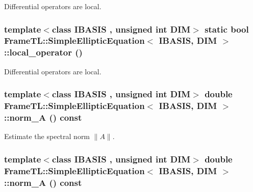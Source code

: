 Differential operators are local. \hypertarget{classFrameTL_1_1SimpleEllipticEquation_cd41f35521f8ac7af05fd0294cbf76ef}{
\subsubsection[{local\_\-operator}]{\setlength{\rightskip}{0pt plus 5cm}template$<$class IBASIS , unsigned int DIM$>$ static bool {\bf FrameTL::SimpleEllipticEquation}$<$ IBASIS, DIM $>$::local\_\-operator ()}}
\label{classFrameTL_1_1SimpleEllipticEquation_cd41f35521f8ac7af05fd0294cbf76ef}


Differential operators are local. \hypertarget{classFrameTL_1_1SimpleEllipticEquation_6d728f871244c8cb079e58eaca8c2402}{
\subsubsection[{norm\_\-A}]{\setlength{\rightskip}{0pt plus 5cm}template$<$class IBASIS , unsigned int DIM$>$ double {\bf FrameTL::SimpleEllipticEquation}$<$ IBASIS, DIM $>$::norm\_\-A () const}}
\label{classFrameTL_1_1SimpleEllipticEquation_6d728f871244c8cb079e58eaca8c2402}


Estimate the spectral norm $\|A\|$. \hypertarget{classFrameTL_1_1SimpleEllipticEquation_6d728f871244c8cb079e58eaca8c2402}{
\subsubsection[{norm\_\-A}]{\setlength{\rightskip}{0pt plus 5cm}template$<$class IBASIS , unsigned int DIM$>$ double {\bf FrameTL::SimpleEllipticEquation}$<$ IBASIS, DIM $>$::norm\_\-A () const}}
\label{classFrameTL_1_1SimpleEllipticEquation_6d728f871244c8cb079e58eaca8c2402}



